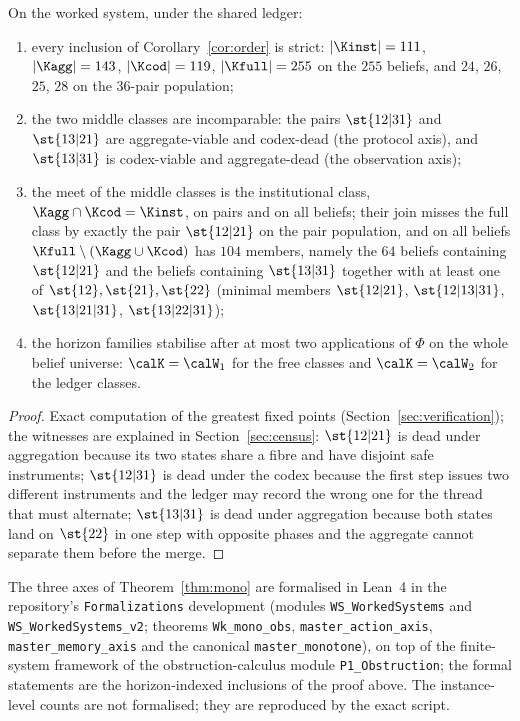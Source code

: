 \begin{proposition}\label{prop:strict}
On the worked system, under the shared ledger:
\begin{enumerate}[label=(\alph*),leftmargin=2em,itemsep=1pt]
\item every inclusion of Corollary~\ref{cor:order} is strict: $|\Kinst|=111$, $|\Kagg|=143$, $|\Kcod|=119$, $|\Kfull|=255$ on the $255$ beliefs, and $24$, $26$, $25$, $28$ on the $36$-pair population;
\item the two middle classes are incomparable: the pairs $\st{12|31}$ and $\st{13|21}$ are aggregate-viable and codex-dead (the protocol axis), and $\st{13|31}$ is codex-viable and aggregate-dead (the observation axis);
\item the meet of the middle classes is the institutional class, $\Kagg\cap\Kcod=\Kinst$, on pairs and on all beliefs; their join misses the full class by exactly the pair $\st{12|21}$ on the pair population, and on all beliefs $\Kfull\setminus(\Kagg\cup\Kcod)$ has $104$ members, namely the $64$ beliefs containing $\st{12|21}$ and the beliefs containing $\st{13|31}$ together with at least one of $\st{12},\st{21},\st{22}$ (minimal members $\st{12|21}$, $\st{12|13|31}$, $\st{13|21|31}$, $\st{13|22|31}$);
\item the horizon families stabilise after at most two applications of $\Phi$ on the whole belief universe: $\calK=\calW_1$ for the free classes and $\calK=\calW_2$ for the ledger classes.
\end{enumerate}
\end{proposition}

\begin{proof}
Exact computation of the greatest fixed points (Section~\ref{sec:verification}); the witnesses are explained in Section~\ref{sec:census}: $\st{12|21}$ is dead under aggregation because its two states share a fibre and have disjoint safe instruments; $\st{12|31}$ is dead under the codex because the first step issues two different instruments and the ledger may record the wrong one for the thread that must alternate; $\st{13|31}$ is dead under aggregation because both states land on $\st{22}$ in one step with opposite phases and the aggregate cannot separate them before the merge.
\end{proof}

\begin{remark}\label{rem:lean}
The three axes of Theorem~\ref{thm:mono} are formalised in Lean~4 in the repository's \texttt{Formalizations} development (modules \texttt{WS\_\allowbreak{}WorkedSystems} and \texttt{WS\_\allowbreak{}WorkedSystems\_\allowbreak{}v2}; theorems \texttt{Wk\_\allowbreak{}mono\_\allowbreak{}obs}, \texttt{master\_\allowbreak{}action\_\allowbreak{}axis}, \texttt{master\_\allowbreak{}memory\_\allowbreak{}axis} and the canonical \texttt{master\_\allowbreak{}monotone}), on top of the finite-system framework of the obstruction-calculus module \texttt{P1\_Obstruction}; the formal statements are the horizon-indexed inclusions of the proof above. The instance-level counts are not formalised; they are reproduced by the exact script.
\end{remark}
